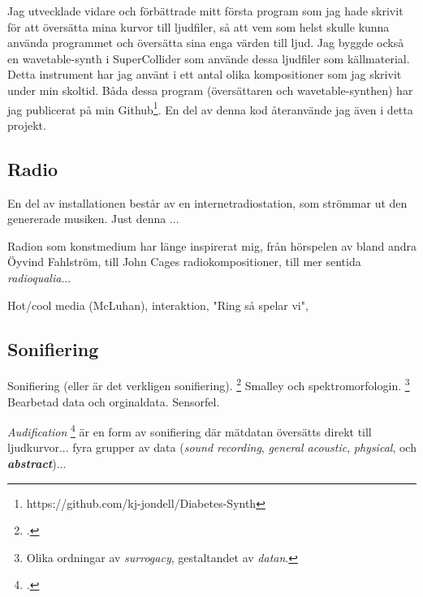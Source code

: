 \documentclass[11pt, twoside, a4paper]{article}
\begin{document}
\begin{multicols}{2}
Jag utvecklade vidare och förbättrade mitt första program som jag hade skrivit för att översätta mina kurvor till ljudfiler, så att vem som helst skulle kunna använda programmet och översätta sina enga värden till ljud. Jag byggde också en wavetable-synth i SuperCollider som använde dessa ljudfiler som källmaterial. Detta instrument har jag använt i ett antal olika kompositioner som jag skrivit under min skoltid. Båda dessa program (översättaren och wavetable-synthen) har jag publicerat på min Github\footnote{https://github.com/kj-jondell/Diabetes-Synth}. En del av denna kod återanvände jag även i detta projekt.


\subsection*{Radio}
En del av installationen består av en internetradiostation, som strömmar ut den genererade musiken. Just denna ...

Radion som konstmedium har länge inspirerat mig, från hörspelen av bland andra Öyvind Fahlström, till John Cages radiokompositioner, till mer sentida \emph{radioqualia}... 

Hot/cool media (McLuhan), interaktion, "Ring så spelar vi", 



\subsection*{Sonifiering}
Sonifiering (eller är det verkligen sonifiering). \footcite[2]{bijsterveld_sonic_2019}
Smalley och spektromorfologin. \footnote{Olika ordningar av \emph{surrogacy},  gestaltandet av \emph{datan}.} Bearbetad data och orginaldata. Sensorfel.

\emph{Audification} \footcite[302]{noauthor_sonification_2011} är en form av sonifiering där mätdatan översätts direkt till ljudkurvor... fyra grupper av data (\emph{sound recording}, \emph{general acoustic}, \emph{physical}, och \textbf{\emph{abstract}})...



\end{multicols}
\end{document}

